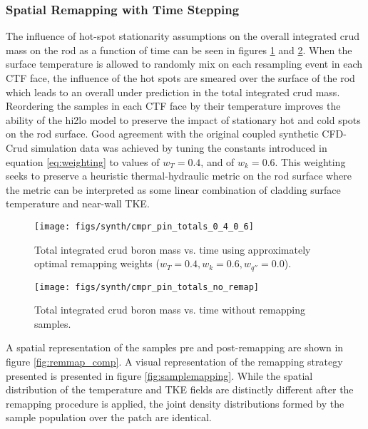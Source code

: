 \subsubsection{Spatial Remapping with Time Stepping}

The influence of hot-spot stationarity assumptions on the overall integrated crud mass on the rod as a function of time can be seen in figures \ref{fig:cmprpintotals0406} and \ref{fig:cmprpintotalsnoremap}.  When the surface temperature is allowed to randomly mix on each resampling event in each CTF face, the influence of the hot spots are smeared over the surface of the rod which leads to an overall under prediction in the total integrated crud mass.  Reordering the samples in each CTF face by their temperature improves the ability of the hi2lo model to preserve the impact of stationary hot and cold spots on the rod surface.  Good agreement with the original coupled synthetic CFD-Crud simulation data was achieved by tuning the constants introduced in equation \ref{eq:weighting} to values of $w_T = 0.4$, and of $w_k = 0.6$.  This weighting seeks to preserve a heuristic thermal-hydraulic metric on the rod surface  where the metric can be interpreted as some linear combination of cladding surface temperature and near-wall TKE. 


\begin{figure}[H]
    \centering
    \texttt{[image: figs/synth/cmpr\_pin\_totals\_0\_4\_0\_6]}
    \caption[Total integrated crud boron mass vs. time using approximately optimal remapping weights.]{Total integrated crud boron mass vs. time using approximately optimal remapping weights ($w_T=0.4, w_{k}=0.6, w_{q''}=0.0$).}
    \label{fig:cmprpintotals0406}
\end{figure}
\begin{figure}[H]
    \centering
    \texttt{[image: figs/synth/cmpr\_pin\_totals\_no\_remap]}
    \caption{Total integrated crud boron mass vs. time without remapping samples.}
    \label{fig:cmprpintotalsnoremap}
\end{figure}

A spatial representation of the samples pre and post-remapping are shown in figure \ref{fig:remmap_comp}.  A visual representation of the remapping strategy presented is presented in figure \ref{fig:samplemapping}.  While the spatial distribution of the temperature and TKE fields are distinctly different after the remapping procedure is applied, the joint density distributions formed by the sample population over the patch are identical. 

